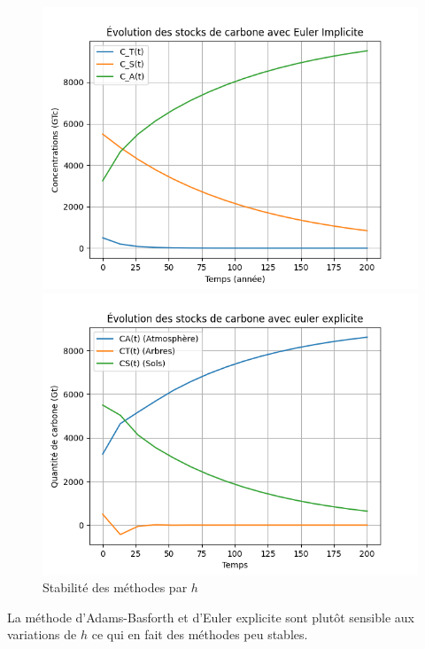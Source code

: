 \documentclass[12pt]{article}
\theoremstyle{saav}
\begin{document}
\begin{figure}[h!]
		\begin{minipage}[b]{0.45\textwidth}
			\centering
			\includegraphics[width=\linewidth]{images/stabilite_euler_implicite.png}
		\end{minipage}
		\hfill
		\begin{minipage}[b]{0.45\textwidth}
			\centering
			\includegraphics[width=\linewidth]{images/stabilte_euler_explicite.png}
		\end{minipage}
		\caption{Stabilité des méthodes par $h$}
	\end{figure}

	
		La méthode d'Adams-Basforth et d'Euler explicite sont plutôt sensible aux variations de $h$ ce qui en fait des méthodes peu stables.
	
\end{document}
